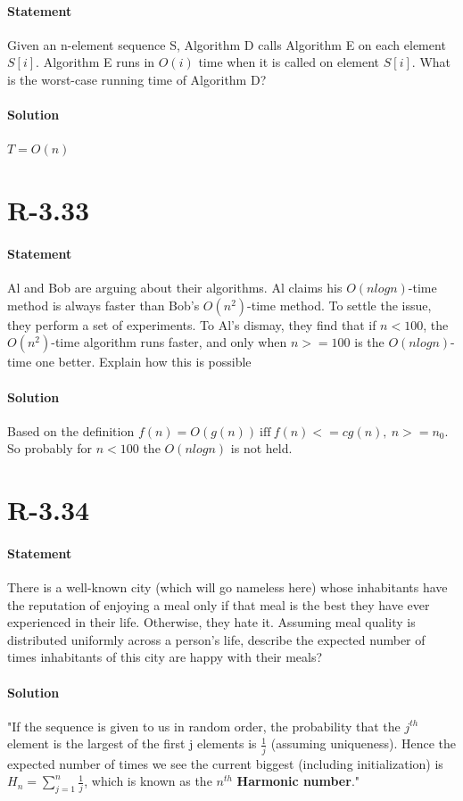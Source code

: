 \documentclass{article}
\begin{document}
  \paragraph{Statement}
  Given an n-element sequence S, Algorithm D calls Algorithm E on each element $S[i]$. Algorithm E runs in $O(i)$ time when it is called on element $S[i]$. What is the worst-case running time of Algorithm D?
  \paragraph{Solution}
  $T=O(n)$
\section{R-3.33}
  \paragraph{Statement}
  Al and Bob are arguing about their algorithms. Al claims his $O(nlogn)$-time method is always faster than Bob’s $O(n^2)$-time method. To settle the issue, they perform a set of experiments. To Al’s dismay, they find that if $n < 100$, the $O(n^2)$-time algorithm runs faster, and only when $n >= 100$ is the $O(nlogn)$-time one better. Explain how this is possible
  \paragraph{Solution}
  Based on the definition $f(n) = O(g(n)) \  \text{iff} \  f(n)<=cg(n), \  n>=n_{0} $. So probably for $n<100$ the $O(nlogn)$ is not held.
\newpage
\section{R-3.34}
  \paragraph{Statement}
  There is a well-known city (which will go nameless here) whose inhabitants have the reputation of enjoying a meal only if that meal is the best they have ever experienced in their life. Otherwise, they hate it. Assuming meal quality is distributed uniformly across a person’s life, describe the expected number of times inhabitants of this city are happy with their meals?
  \paragraph{Solution}
  "If the sequence is given to us in random order, the probability that the $j^{th}$ element is the largest of the first j elements is $\frac{1}{j}$ (assuming uniqueness). Hence the expected number of times we see the current biggest (including initialization) is $H_{n} = \sum_{j=1}^{n}\frac{1}{j}$, which is known as the $n^{th}$ \textbf{Harmonic number}."
\end{document}
